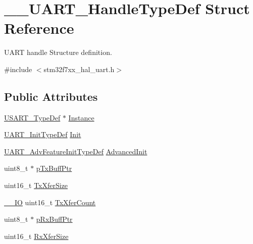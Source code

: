 \hypertarget{struct_____u_a_r_t___handle_type_def}{}\section{\+\_\+\+\_\+\+U\+A\+R\+T\+\_\+\+Handle\+Type\+Def Struct Reference}
\label{struct_____u_a_r_t___handle_type_def}


U\+A\+RT handle Structure definition.  




{\ttfamily \#include $<$stm32f7xx\+\_\+hal\+\_\+uart.\+h$>$}

\subsection*{Public Attributes}
\begin{DoxyCompactItemize}
\item 
\mbox{\hyperlink{struct_u_s_a_r_t___type_def}{U\+S\+A\+R\+T\+\_\+\+Type\+Def}} $\ast$ \mbox{\hyperlink{struct_____u_a_r_t___handle_type_def_aadd8a626e4d5dd937ee1b6461365831a}{Instance}}
\item 
\mbox{\hyperlink{struct_u_a_r_t___init_type_def}{U\+A\+R\+T\+\_\+\+Init\+Type\+Def}} \mbox{\hyperlink{struct_____u_a_r_t___handle_type_def_a56ed519d3ec77350c528fb8536bd9f5a}{Init}}
\item 
\mbox{\hyperlink{struct_u_a_r_t___adv_feature_init_type_def}{U\+A\+R\+T\+\_\+\+Adv\+Feature\+Init\+Type\+Def}} \mbox{\hyperlink{struct_____u_a_r_t___handle_type_def_a88c54ae212a356b0cfef3192374ebb09}{Advanced\+Init}}
\item 
uint8\+\_\+t $\ast$ \mbox{\hyperlink{struct_____u_a_r_t___handle_type_def_aab963198dfbbcf98902222de810fcc31}{p\+Tx\+Buff\+Ptr}}
\item 
uint16\+\_\+t \mbox{\hyperlink{struct_____u_a_r_t___handle_type_def_a1ba050351021762bf0414f9af78080c7}{Tx\+Xfer\+Size}}
\item 
\mbox{\hyperlink{core__sc300_8h_aec43007d9998a0a0e01faede4133d6be}{\+\_\+\+\_\+\+IO}} uint16\+\_\+t \mbox{\hyperlink{struct_____u_a_r_t___handle_type_def_a640bb2017f3d6c58937c9cc8f0c866c2}{Tx\+Xfer\+Count}}
\item 
uint8\+\_\+t $\ast$ \mbox{\hyperlink{struct_____u_a_r_t___handle_type_def_a3b693f9fad7d2feed3103b296e8960a8}{p\+Rx\+Buff\+Ptr}}
\item 
uint16\+\_\+t \mbox{\hyperlink{struct_____u_a_r_t___handle_type_def_adcd45d8ba72e0883dc85a6f217437809}{Rx\+Xfer\+Size}}
\item 

\end{DoxyCompactItemize}
